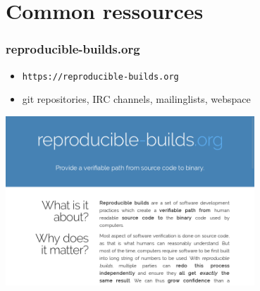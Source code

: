 \documentclass[14pt]{beamer}
\begin{document}
\section{Common ressources}

\begin{frame}
 \frametitle{reproducible-builds.org}

 \begin{itemize}
  \item \texttt{https://reproducible-builds.org}
  \item git repositories, IRC channels, mailinglists, webspace
 \end{itemize}
 \begin{center}
 \includegraphics[width=0.7\textwidth]{images/rbwww1.png}
 \end{center}
\end{frame}
\end{document}

